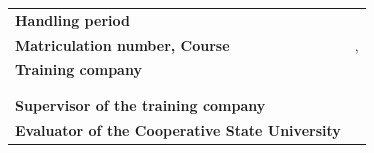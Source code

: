 {\begin{titlepage}
\begin{center}
\begin{spacing}{0.8}
\begin{tabular}{ll}
					\textbf{Handling period}       				&  \daterange{\bearbeitungszeitraumBeginn}{\bearbeitungszeitraumEnde}\\[0.2cm]
					\textbf{Matriculation number, Course}	   	&  \matrikelnr, \kurs\\[0.2cm]
					\textbf{Training company}              					 &  \firmaName\\
																							& \firmaStrasse \\
																							& \firmaPlz\\[0.2cm]
					\textbf{Supervisor of the training company}          &  \betreuerFirma\\[0.2cm]
					\textbf{Evaluator of the  Cooperative State University}    &  \betreuerDhbw\\[0.2cm]
				\end{tabular} 
			\end{spacing}
		\end{center}
	\end{titlepage}
}
